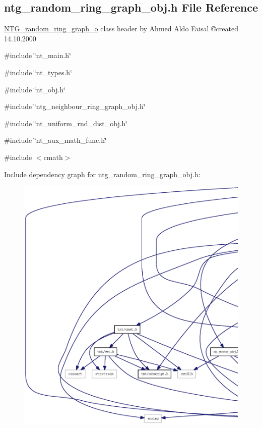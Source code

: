 \subsection{ntg\_\-random\_\-ring\_\-graph\_\-obj.h File Reference}
\label{ntg__random__ring__graph__obj_8h}



\begin{DoxyItemize}
\item \hyperlink{class_n_t_g__random__ring__graph__o}{NTG\_\-random\_\-ring\_\-graph\_\-o} class header by Ahmed Aldo Faisal \copyright created 14.10.2000 
\end{DoxyItemize} 


{\ttfamily \#include \char`\"{}nt\_\-main.h\char`\"{}}\par
{\ttfamily \#include \char`\"{}nt\_\-types.h\char`\"{}}\par
{\ttfamily \#include \char`\"{}nt\_\-obj.h\char`\"{}}\par
{\ttfamily \#include \char`\"{}ntg\_\-neighbour\_\-ring\_\-graph\_\-obj.h\char`\"{}}\par
{\ttfamily \#include \char`\"{}nt\_\-uniform\_\-rnd\_\-dist\_\-obj.h\char`\"{}}\par
{\ttfamily \#include \char`\"{}nt\_\-aux\_\-math\_\-func.h\char`\"{}}\par
{\ttfamily \#include $<$cmath$>$}\par
Include dependency graph for ntg\_\-random\_\-ring\_\-graph\_\-obj.h:
\nopagebreak
\begin{figure}[H]
\begin{center}
\leavevmode
\includegraphics[width=400pt]{ntg__random__ring__graph__obj_8h__incl}
\end{center}
\end{figure}

